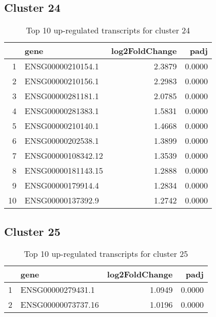 \documentclass{article}
\begin{document}
\subsection{Cluster 24 }
\begin{table}[H]
\centering
\begin{tabularx}{\textwidth}{rlrr}
  \hline
 & gene & log2FoldChange & padj \\ 
  \hline
1 & ENSG00000210154.1 & 2.3879 & 0.0000 \\ 
  2 & ENSG00000210156.1 & 2.2983 & 0.0000 \\ 
  3 & ENSG00000281181.1 & 2.0785 & 0.0000 \\ 
  4 & ENSG00000281383.1 & 1.5831 & 0.0000 \\ 
  5 & ENSG00000210140.1 & 1.4668 & 0.0000 \\ 
  6 & ENSG00000202538.1 & 1.3899 & 0.0000 \\ 
  7 & ENSG00000108342.12 & 1.3539 & 0.0000 \\ 
  8 & ENSG00000181143.15 & 1.2888 & 0.0000 \\ 
  9 & ENSG00000179914.4 & 1.2834 & 0.0000 \\ 
  10 & ENSG00000137392.9 & 1.2742 & 0.0000 \\ 
   \hline
\end{tabularx}
\caption{Top 10 up-regulated transcripts for cluster 24} 
\label{tab:q3_1_24}
\end{table}
\subsection{Cluster 25 }
\begin{table}[H]
\centering
\begin{tabularx}{\textwidth}{rlrr}
  \hline
 & gene & log2FoldChange & padj \\ 
  \hline
1 & ENSG00000279431.1 & 1.0949 & 0.0000 \\ 
  2 & ENSG00000073737.16 & 1.0196 & 0.0000 \\ 
   \hline
\end{tabularx}
\caption{Top 10 up-regulated transcripts for cluster 25} 
\label{tab:q3_1_25}
\end{table}
\end{document}
